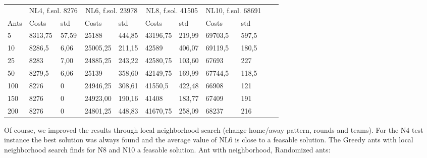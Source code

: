 \begin{minipage}[b]{1.0\textwidth}
    \begin{tabular}{ l | ll | ll | ll | ll | ll}
	\hline
	& \multicolumn{2}{c}{NL4, f.sol. 8276} & \multicolumn{2}{c}{NL6, f.sol. 23978}
	& \multicolumn{2}{c}{NL8, f.sol. 41505} & \multicolumn{2}{c}{NL10, f.sol. 68691} \\
	\cline{1-9}
	Ants & Costs & std & Costs & std & Costs & std & Costs & std \\
	\hline
	5   &  8313,75  & 57,59 &  25188    & 444,85 &  43196,75  & 219,99 &  69703,5  & 597,5 \\
	10  &  8286,5   & 6,06 &  25005,25  & 211,15 &  42589     & 406,07 &  69119,5  & 180,5 \\
	25  &  8283    & 7,00 &  24885,25   & 243,22 &  42580,75  & 103,60 &  67693 	& 227 \\
	50  &  8279,5  & 6,06 &  25139    & 358,60 &  42149,75   & 169,99 &  67744,5    & 118,5 \\
	100 &  8276    & 0 &  24946,25    & 308,61 &  41550,5    & 422,48 &  66908    & 121 \\
	150 &  8276    & 0 &  24923,00    & 190,16 &  41408      & 183,77 &  67409    &
	191 \\ 200 &  8276    & 0 &  24801,25    & 448,83 &  41670,75   & 258,09 &  68237    & 216 \\
	\hline
	\end{tabular}
\end{minipage}
\newline
Of course, we improved the results through local neighborhood search
(change home/away pattern, rounds and teams). For the N4 test instance the best
solution was always found and the average value of NL6 is close to a feasable solution. The Greedy ants with local neighborhood search
 finds for N8 and N10 a feasable solution.
\newline
Ant with neighborhood, Randomized ants:
\newline
